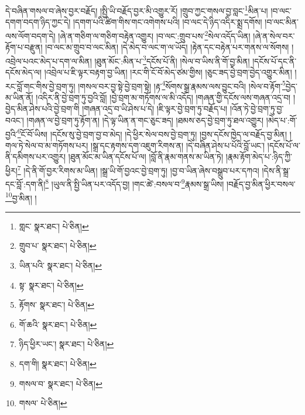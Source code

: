 དེ་བཞིན་གསལ་བ་ཞེས་བྱར་བརྗོད། །སྤྱི་ཡི་བརྗོད་བྱར་མི་འགྱུར་རོ། །གྲུབ་ཀྱང་གསལ་བྱ་བླང་\footnote{གླང་  སྣར་ཐང་།  པེ་ཅིན། }མིན་པ། །བ་ལང་དགག་བདག་ཉིད་ཀྱང་དེ། །དགག་པའི་ཚིག་གིས་གང་འགེགས་པའི། །བ་ལང་དེ་ཉིད་འདིར་སྨྲ་དགོས། །བ་ལང་མིན་ལས་ལོག་བདག་དེ། །ཞེ་ན་གཅིག་ལ་གཅིག་བརྟེན་འགྱུར། །བ་ལང་:གྲུབ་པས་\footnote{གྲུབ་པ་  སྣར་ཐང་།  པེ་ཅིན། }སེལ་འདོད་ཡིན། །ཞེ་ན་སེལ་བར་རྟོག་པ་བརྫུན། །བ་ལང་མ་གྲུབ་བ་ལང་མིན། །དེ་མེད་བ་ལང་ག་ལ་ཡོད། །རྟེན་དང་བརྟེན་པར་གནས་ལ་སོགས། །འབྲེལ་པའང་མེད་པ་དག་ལ་མིན། །ཐུན་མོང་:མིན་པ་\footnote{ཡིན་པའི་  སྣར་ཐང་།  པེ་ཅིན། }དངོས་པོ་ནི། །སེལ་བ་ཡིས་ནི་གོ་བྱ་མིན། །དངོས་པོ་དང་ནི་དངོས་མེད་ལ། །འབྲེལ་པ་ཇི་ལྟར་བརྟག་བྱ་ཡིན། །རང་གི་ངོ་བོ་མེད་ཙམ་གྱིས། །ཅུང་ཟད་བྱེ་བྲག་བྱེད་འགྱུར་མིན། །རང་བློ་གང་གིས་བྱེ་བྲག་ཏུ། །གསལ་བར་བྱ་སྟེ་བྱེ་བྲག་སྟེ། །རྟ་\footnote{སྟ་  སྣར་ཐང་།  པེ་ཅིན། }སོགས་སྒྲ་རྣམས་ལས་བྱུང་བའི། །སེལ་བ་རྟོག་\footnote{རྟོགས་  སྣར་ཐང་།  པེ་ཅིན། }བྱེད་མ་ཡིན་ནོ། །འདིར་ནི་བྱེ་བྲག་ཏུ་བྱའི་བློ། །བྱེ་བྲག་མ་གཏོགས་ལ་མི་འདོད། །གཞན་གྱི་དངོས་ལས་གཞན་འདྲ་བ། །བྱེད་མིན་ཤེས་པའི་བྱེ་བྲག་གི །གཞན་འདྲ་བ་ཡི་ཤེས་པ་དེ། །ཇི་ལྟར་བྱེ་བྲག་ཏུ་བརྗོད་པ། །འོན་ཏེ་བྱེ་བྲག་ཏུ་བྱ་བའང་། །གཞན་ལ་བྱེ་བྲག་ཏུ་རྟོག་ན། །དེ་ལྟ་ཡིན་ན་གང་ཅུང་ཟད། །ཐམས་ཅད་བྱེ་བྲག་ཏུ་ཐལ་འགྱུར། །མེད་པ་:གོ་བྱའི་\footnote{གོ་ཆའི་  སྣར་ཐང་།  པེ་ཅིན། }ངོ་བོ་ཡིས། །དངོས་སུ་བྱེ་བྲག་བྱ་བ་མེད། །དེ་ཕྱིར་སེལ་བས་བྱེ་བྲག་ཏུ། །བྱས་དངོས་ཁྱེད་ལ་བརྗོད་བྱ་མིན། །གལ་ཏེ་སེལ་བ་མ་གཏོགས་པར། །སྒྲ་དང་རྟགས་དག་འཇུག་རིགས་ན། །དེ་བཞིན་ཤེས་པ་པོའི་བློ་ཡང་། །དངོས་པོ་ལ་ནི་དམིགས་པར་འགྱུར། །ཐུན་མོང་མ་ཡིན་དངོས་པོ་ལ། །བློ་ནི་རྣམ་གནས་མ་ཡིན་ཏེ། །རྣམ་རྟོག་མེད་པ་:ཉིད་ཀྱི་ཕྱིར།\footnote{ཉིད་ཕྱིར་ཡང་།  སྣར་ཐང་།  པེ་ཅིན། } །དེ་ནི་གོ་བྱར་རིགས་མ་ཡིན། །སྒྲ་ཡི་གོ་བྱའང་བྱེ་བྲག་ཏུ། །བྱ་བ་ཡིན་ཞེས་བསྒྲུབ་པར་དཀའ། །དེས་ནི་སྒྲ་དང་བློ་:དག་ནི།\footnote{དག་གི།  སྣར་ཐང་།  པེ་ཅིན། } །ཡུལ་ནི་སྤྱི་ཡིན་པར་འདོད་བྱ། །གང་ཚེ་:བསལ་བ་\footnote{གསལ་བ་  སྣར་ཐང་།  པེ་ཅིན། }རྣམས་སྒྲ་ཡིས། །བརྗོད་བྱ་མིན་ཕྱིར་བསལ་\footnote{གསལ་  པེ་ཅིན། }བྱ་མིན། །
